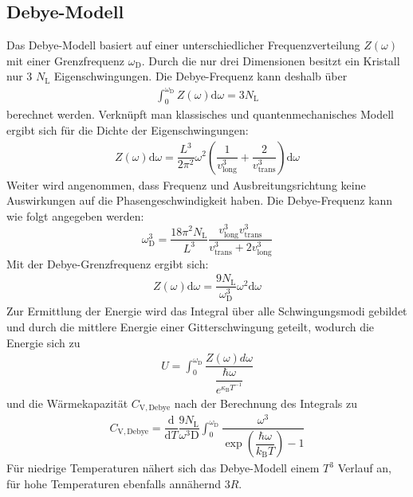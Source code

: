 \subsection{Debye-Modell}
\label{sec:Debby-Modell}
Das Debye-Modell basiert auf einer unterschiedlicher Frequenzverteilung $Z(\omega)$ mit einer Grenzfrequenz $\omega_\mathrm{D}$. Durch die nur drei Dimensionen besitzt ein Kristall nur 3 $N_\mathrm{L}$ Eigenschwingungen. Die Debye-Frequenz kann deshalb über
\begin{align}
  \label{eqn:Deby-Frequenz}
 \int_{0}^{\omega_\mathrm{D}} Z(\omega) \mathrm{d}\omega = 3N_\mathrm{L}
\end{align}
berechnet werden. Verknüpft man klassisches und quantenmechanisches Modell ergibt sich für die Dichte der Eigenschwingungen:
\begin{align}
  \label{eqn:Eigenschwingungen2}
 Z(\omega) \mathrm{d}\omega = \dfrac{L^3}{2\pi^2} \omega^2 \left(\dfrac{1}{v_\mathrm{long}^3}+\dfrac{2}{v_\mathrm{trans}^3}\right) \mathrm{d}\omega
\end{align}
Weiter wird angenommen, dass Frequenz und Ausbreitungsrichtung keine Auswirkungen auf die Phasengeschwindigkeit haben.
Die Debye-Frequenz kann wie folgt angegeben werden:
\begin{equation}
  \label{eqn:Eigenschwingungen}
  \omega_\mathrm{D}^3=\dfrac{18\pi^2N_\mathrm{L}}{L^3}\dfrac{v_\mathrm{long}^3v_\mathrm{trans}^3}{v_\mathrm{trans}^3+2v_\mathrm{long}^3}
\end{equation}
Mit der Debye-Grenzfrequenz ergibt sich:
\begin{align}
  \label{eqn:Debby 3}
 Z(\omega) \mathrm{d}\omega = \dfrac{9N_\mathrm{L}}{\omega_\mathrm{D}^3} \omega^2 \mathrm{d}\omega
\end{align}
Zur Ermittlung der Energie wird das Integral über alle Schwingungsmodi gebildet und durch die mittlere Energie einer Gitterschwingung geteilt, wodurch die Energie sich zu
\begin{align}
  \label{eqn:Debye-Energie}
 U = \int_{0}^{\omega_\mathrm{D}} \dfrac{Z(\omega) d\omega} { \dfrac{\hbar\omega}{e^{\kappa_\mathrm{B}T^{-1}}}}
\end{align}
und die Wärmekapazität $C_\mathrm{V,Debye}$ nach der Berechnung des Integrals zu
\begin{align}
  \label{eqn:DebyeWärmekapazität}
 C_\mathrm{V,Debye} = \dfrac{\mathrm{d}}{\mathrm{d}T}  \dfrac{9N_\mathrm{L}}{{\omega^3}\mathrm{D}} \int_{0}^{\omega_\mathrm{D}} \dfrac{\omega^3}{\exp\left(\dfrac{\hbar\omega}{k_\mathrm{B}T}\right)-1}
\end{align}
Für niedrige Temperaturen nähert sich das Debye-Modell einem $T^3$ Verlauf an, für hohe Temperaturen ebenfalls annähernd $3R$.
